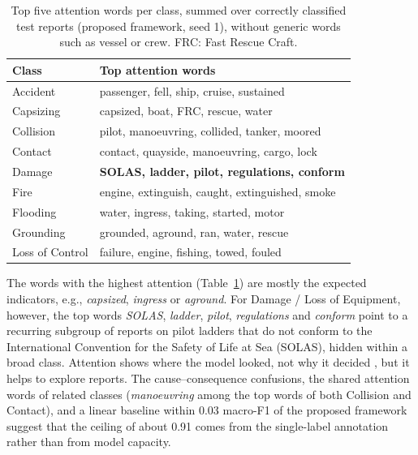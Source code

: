 \documentclass[conference]{IEEEtran}
\begin{document}
\begin{table}[t]
\caption{Top five attention words per class, summed over correctly classified test reports (proposed framework, seed 1), without generic words such as vessel or crew. FRC: Fast Rescue Craft.}
\label{tab:attention}
\centering
\footnotesize
\begin{tabular}{ll}
\toprule
Class & Top attention words \\
\midrule
Accident & passenger, fell, ship, cruise, sustained \\
Capsizing & capsized, boat, FRC, rescue, water \\
Collision & pilot, manoeuvring, collided, tanker, moored \\
Contact & contact, quayside, manoeuvring, cargo, lock \\
Damage & \textbf{SOLAS, ladder, pilot, regulations, conform} \\
Fire & engine, extinguish, caught, extinguished, smoke \\
Flooding & water, ingress, taking, started, motor \\
Grounding & grounded, aground, ran, water, rescue \\
Loss of Control & failure, engine, fishing, towed, fouled \\
\bottomrule
\end{tabular}
\end{table}

The words with the highest attention (Table~\ref{tab:attention}) are mostly the expected indicators, e.g., \emph{capsized}, \emph{ingress} or \emph{aground}. For Damage / Loss of Equipment, however, the top words \emph{SOLAS}, \emph{ladder}, \emph{pilot}, \emph{regulations} and \emph{conform} point to a recurring subgroup of reports on pilot ladders that do not conform to the International Convention for the Safety of Life at Sea (SOLAS), hidden within a broad class. Attention shows where the model looked, not why it decided \cite{elzini2022explainability}, but it helps to explore reports. The cause--consequence confusions, the shared attention words of related classes (\emph{manoeuvring} among the top words of both Collision and Contact), and a linear baseline within 0.03 macro-F1 of the proposed framework suggest that the ceiling of about 0.91 comes from the single-label annotation rather than from model capacity.

\end{document}
